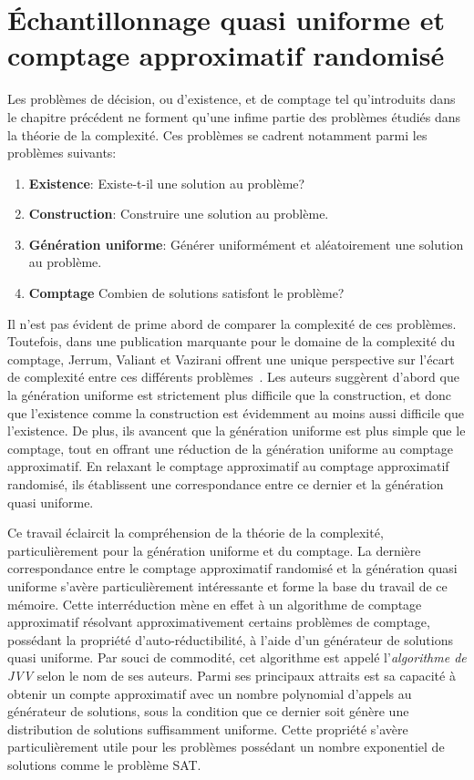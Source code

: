 \chapter{Échantillonnage quasi uniforme et comptage approximatif randomisé}
\label{cha:echantillonnage-quasi-uniforme-comptage-approximatif-randomise}

Les problèmes de décision, ou d'existence, et de comptage tel qu'introduits dans le chapitre précédent ne forment qu'une infime partie des problèmes étudiés dans la théorie de la complexité. Ces problèmes se cadrent notamment parmi les problèmes suivants:

\begin{enumerate}[(1)]
    \item \textbf{Existence}: Existe-t-il une solution au problème?
    \item \textbf{Construction}: Construire une solution au problème.
    \item \textbf{Génération uniforme}: Générer uniformément et aléatoirement une solution au problème.
    \item \textbf{Comptage} Combien de solutions satisfont le problème?
\end{enumerate}

Il n'est pas évident de prime abord de comparer la complexité de ces problèmes. Toutefois, dans une publication marquante pour le domaine de la complexité du comptage, Jerrum, Valiant et Vazirani offrent une unique perspective sur l'écart de complexité entre ces différents problèmes~\cite{jerrumRandomGenerationCombinatorial1986}. Les auteurs suggèrent d'abord que la génération uniforme est strictement plus difficile que la construction, et donc que l'existence comme la construction est évidemment au moins aussi difficile que l'existence. De plus, ils avancent que la génération uniforme est plus simple que le comptage, tout en offrant une réduction de la génération uniforme au comptage approximatif. En relaxant le comptage approximatif au comptage approximatif randomisé, ils établissent une correspondance entre ce dernier et la génération quasi uniforme.

Ce travail éclaircit la compréhension de la théorie de la complexité, particulièrement pour la génération uniforme et du comptage. La dernière correspondance entre le comptage approximatif randomisé et la génération quasi uniforme s'avère particulièrement intéressante et forme la base du travail de ce mémoire. Cette interréduction mène en effet à un algorithme de comptage approximatif résolvant approximativement certains problèmes de comptage, possédant la propriété d'auto-réductibilité, à l'aide d'un générateur de solutions quasi uniforme. Par souci de commodité, cet algorithme est appelé l'\textit{algorithme de JVV} selon le nom de ses auteurs. Parmi ses principaux attraits est sa capacité à obtenir un compte approximatif avec un nombre polynomial d'appels au générateur de solutions, sous la condition que ce dernier soit génère une distribution de solutions suffisamment uniforme. Cette propriété s'avère particulièrement utile pour les problèmes possédant un nombre exponentiel de solutions comme le problème SAT.

